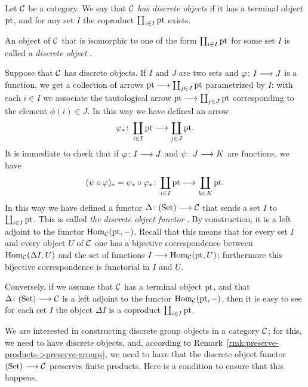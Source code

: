 \begin{2   CONTRAVARIANT FUNCTORS}
\begin{2.2 Group objects}
\begin{definition}
Let $\mathcal{C}$ be a category. We say that $\mathcal{C}$ \emph{has discrete objects}%
 if it has a terminal object $\mathrm{pt}$, and for any set $I$ the coproduct $\coprod_{i \in I} \mathrm{pt}$ exists.

An object of $\mathcal{C}$ that is isomorphic to one of the form $\coprod_{i \in I} \mathrm{pt}$ for some set $I$ is called a \emph{discrete object}%
%
.
\end{definition}

Suppose that $\mathcal{C}$ has discrete objects. If $I$ and $J$ are two sets and $\phi \colon I \arr J$ is a function, we get a collection of arrows $\pt \arr \coprod_{j \in J} \pt$ parametrized by $I$: with each $i \in I$ we associate the tautological arrow $\pt \arr \coprod_{j \in J} \pt$ corresponding to the element $\phi(i) \in J$. In this way we have defined an arrow
   \[
   \phi_* \colon \coprod_{i \in I}\pt \arr
   \coprod_{j \in J}\pt.
   \]
It is immediate to check that if $\phi \colon I \arr J$ and $\psi \colon J \arr K$ are functions, we have
   \[
   (\psi \circ \phi)_* = \psi_* \circ \phi_* \colon 
   \coprod_{i \in I}\pt \arr \coprod_{k \in K}\pt.
   \]
In this way we have defined a functor $\Delta \colon \catset \arr
\cC$ that sends a set $I$ to $\coprod_{i \in I} \mathrm{pt}$. This is called \emph{the discrete object functor}%
%
%
. By construction, it is a left adjoint to the functor $\operatorname{Hom}_{\mathcal{C}}(\mathrm{pt}, -)$. Recall that this means that for every set $I$ and every object $U$ of $\mathcal{C}$ one has a bijective correspondence between $\operatorname{Hom}_{\mathcal{C}}(\Delta I, U)$ and the set of functions $I \arr \hom_{\cC}(\pt, U)$; furthermore this bijective correspondence is functorial in $I$ and $U$.

Conversely, if we assume that $\mathcal{C}$ has a terminal object $\mathrm{pt}$, and that $\Delta \colon \catset \arr \cC$ is a left adjoint to the functor $\operatorname{Hom}_{\mathcal{C}}(\mathrm{pt}, -)$, then it is easy to see for each set $I$ the object $\Delta I$ is a coproduct $\coprod_{i \in I} \mathrm{pt}$.

We are interested in constructing discrete group objects in a category $\mathcal{C}$; for this, we need to have discrete objects, and, according to Remark~\ref{rmk:preserve-products->preserve-groups}, we need to have that the discrete object functor $\catset \arr \cC$ preserves finite products. Here is a condition to ensure that this happens.


\end{2.2 Group objects}
\end{2   CONTRAVARIANT FUNCTORS}
